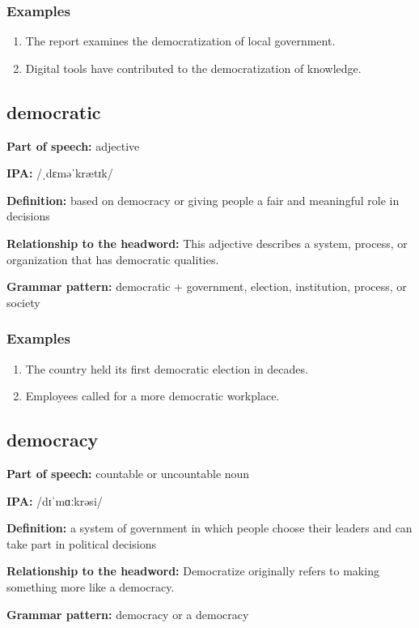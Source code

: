 \documentclass[11pt]{article}
\begin{document}
\subsubsection{Examples}
\begin{enumerate}
  \item The report examines the democratization of local government.
  \item Digital tools have contributed to the democratization of knowledge.
\end{enumerate}

\subsection{democratic}
\textbf{Part of speech:} adjective

\textbf{IPA:} /ˌdɛməˈkrætɪk/

\textbf{Definition:} based on democracy or giving people a fair and meaningful role in decisions

\textbf{Relationship to the headword:} This adjective describes a system, process, or organization that has democratic qualities.

\textbf{Grammar pattern:} democratic + government, election, institution, process, or society

\subsubsection{Examples}
\begin{enumerate}
  \item The country held its first democratic election in decades.
  \item Employees called for a more democratic workplace.
\end{enumerate}

\subsection{democracy}
\textbf{Part of speech:} countable or uncountable noun

\textbf{IPA:} /dɪˈmɑːkrəsi/

\textbf{Definition:} a system of government in which people choose their leaders and can take part in political decisions

\textbf{Relationship to the headword:} Democratize originally refers to making something more like a democracy.

\textbf{Grammar pattern:} democracy or a democracy
\end{document}
